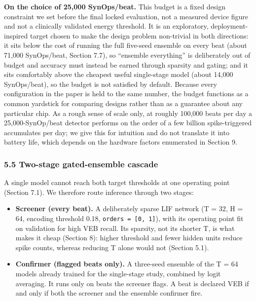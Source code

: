 \documentclass[
]{article}
\providecommand{\tightlist}{%
  \setlength{\itemsep}{0pt}\setlength{\parskip}{0pt}}
\begin{document}
\textbf{On the choice of 25,000 SynOps/beat.} This budget is a fixed
design constraint we set before the final locked evaluation, not a
measured device figure and not a clinically validated energy threshold.
It is an exploratory, deployment-inspired target chosen to make the
design problem non-trivial in both directions: it sits below the cost of
running the full five-seed ensemble on every beat (about 71,000
SynOps/beat, Section 7.7), so ``ensemble everything'' is deliberately
out of budget and accuracy must instead be earned through sparsity and
gating; and it sits comfortably above the cheapest useful single-stage
model (about 14,000 SynOps/beat), so the budget is not satisfied by
default. Because every configuration in the paper is held to the same
number, the budget functions as a common yardstick for comparing designs
rather than as a guarantee about any particular chip. As a rough sense
of scale only, at roughly 100,000 beats per day a 25,000-SynOp/beat
detector performs on the order of a few billion spike-triggered
accumulates per day; we give this for intuition and do not translate it
into battery life, which depends on the hardware factors enumerated in
Section 9.

\subsubsection{5.5 Two-stage gated-ensemble
cascade}\label{two-stage-gated-ensemble-cascade}

A single model cannot reach both target thresholds at one operating
point (Section 7.1). We therefore route inference through two stages:

\begin{itemize}
\tightlist
\item
  \textbf{Screener (every beat).} A deliberately sparse LIF network (T =
  32, H = 64, encoding threshold 0.18, \texttt{orders\ =\ {[}0,\ 1{]}}),
  with its operating point fit on validation for high VEB recall. Its
  sparsity, not its shorter T, is what makes it cheap (Section 8):
  higher threshold and fewer hidden units reduce spike counts, whereas
  reducing T alone would not (Section 5.1).
\item
  \textbf{Confirmer (flagged beats only).} A three-seed ensemble of the
  T = 64 models already trained for the single-stage study, combined by
  logit averaging. It runs only on beats the screener flags. A beat is
  declared VEB if and only if both the screener and the ensemble
  confirmer fire.
\end{itemize}
\end{document}
